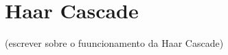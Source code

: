 \documentclass[12pt, %
openright, 
oneside, %
a4paper,    %
brazil]{facom-ufu-abntex2}
\begin{document}





\section{Haar Cascade}
 (escrever sobre o fuuncionamento da Haar Cascade)
\end{document}
